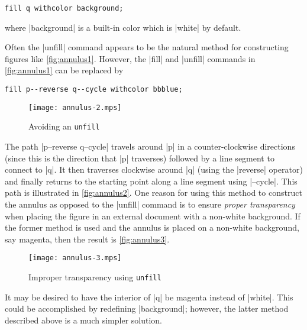 \begin{lstlisting}[style=MP]
fill q withcolor background;
\end{lstlisting}
where |background| is a built-in color which is |white| by default.

Often the |unfill| command appears to be the natural method for
constructing figures like \autoref{fig:annulus1}.  However, the |fill|
and |unfill| commands in \autoref{fig:annulus1} can be replaced by

\begin{lstlisting}[style=MP]
fill p--reverse q--cycle withcolor bbblue;
\end{lstlisting}

\begin{figure}
  \centering
  \texttt{[image: annulus-2.mps]}
  \caption{Avoiding an \texttt{unfill}}
  \label{fig:annulus2}
\end{figure}

The path |p--reverse q--cycle| travels around |p| in a counter-clockwise
directions (since this is the direction that |p| traverses) followed by
a line segment to connect to |q|.  It then traverses clockwise around
|q| (using the |reverse| operator) and finally returns to the starting
point along a line segment using |--cycle|.  This path is illustrated in
\autoref{fig:annulus2}.  One reason for using this method to construct
the annulus as opposed to the |unfill| command is to ensure
\textit{proper transparency} when placing the figure in an external
document with a non-white background.  If the former method is used and
the annulus is placed on a non-white background, say magenta, then the
result is \autoref{fig:annulus3}.

\begin{figure}
  \centering
  \texttt{[image: annulus-3.mps]}
  \caption{Improper transparency using \texttt{unfill}}
  \label{fig:annulus3}
\end{figure}

It may be desired to have the interior of |q| be magenta instead of
|white|.  This could be accomplished by redefining |background|;
however, the latter method described above is a much simpler solution.
